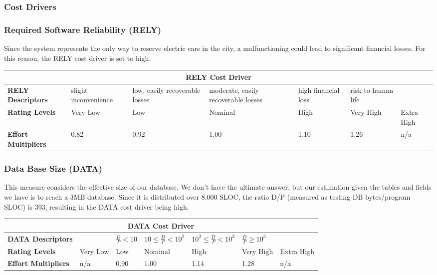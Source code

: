 \subsubsection{Cost Drivers}
\subsubsection*{Required Software Reliability (RELY)}
Since the system represents the only way to reserve electric cars in the city, a malfunctioning could lead to significant financial losses. For this reason, the RELY cost driver is set to high.

\begin{table}[H]
	\centering
	\begin{tabular}{| m{1.8cm} | m{1.8cm} | m{1.7cm} | m{1.7cm} | m{1.3cm} | m{1.3cm} | m{1cm} | }
		\hline
		\multicolumn{7}{|c|}{ \textbf{RELY Cost Driver} } \\
		\hline
		\hline
		\textbf{RELY Descriptors} & slight inconvenience & low, easily recoverable losses & moderate, easily recoverable losses & high financial loss & risk to human life & \\
		\hline
		\textbf{Rating Levels} & Very Low & Low & Nominal & High & Very High & Extra High \\
		\hline
		\textbf{Effort Multipliers} & 0.82 & 0.92 & 1.00 & 1.10 & 1.26 & n/a \\ 
		\hline
	\end{tabular}
\end{table}

\subsubsection*{Data Base Size (DATA)}
This measure considers the effective size of our database. We don't have the ultimate answer, but our estimation given the tables and fields we have is to reach a 3MB database. Since it is distributed over 8.000 SLOC, the ratio D/P (measured as testing DB bytes/program SLOC) is 393, resulting in the DATA cost driver being high.

\begin{table}[H]
	\centering
	\begin{tabular}{| m{1.8cm} | m{0.8cm} | m{1.4cm} | m{2.5cm} | m{2.7cm} | m{1.5cm} | m{0.9cm} | }
		\hline
		\multicolumn{7}{|c|}{ \textbf{DATA Cost Driver} } \\
		\hline
		\hline
		\textbf{DATA Descriptors} & & \(\frac{D}{P} < 10\)  & \(10 \leq \frac{D}{P} < 10^2\) & \( 10^2 \leq \frac{D}{P} < 10^3\) & \(\frac{D}{P}\geq 10^3\) & \\
		\hline
		\textbf{Rating Levels} & Very Low & Low & Nominal & High & Very High & Extra High \\
		\hline
		\textbf{Effort Multipliers} & n/a & 0.90 & 1.00 & 1.14 & 1.28 & n/a \\ 
		\hline
	\end{tabular}
\end{table} 

